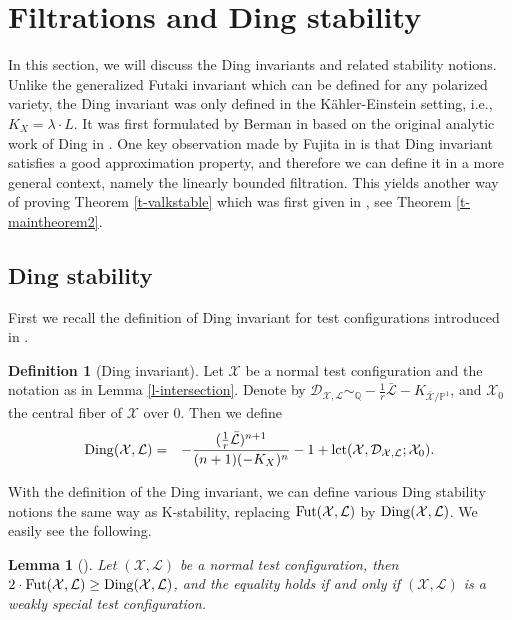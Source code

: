 \documentclass[12pt,reqno]{amsart}%
\newcommand{\cX}{{\mathcal{X}}}
\newcommand{\cL}{{\mathcal{L}}}
\newtheorem{lem}[thm]{Lemma}
\theoremstyle{definition}
\newtheorem{defn}[thm]{Definition}
\theoremstyle{remark}
\newcommand{\Fut}{{\rm Fut}}
\newcommand{\Ding}{{\rm Ding}}
\newcommand{\cD}{{\mathcal{D}}}
\newcommand{\lct}{{\rm lct}}
\newcommand{\bQ}{{\mathbb{Q}}}
\begin{document}
\section{Filtrations and Ding stability}\label{s-Ding}

In this section, we will discuss the Ding invariants and related stability notions. Unlike the generalized Futaki invariant which can be defined for any polarized variety, the Ding invariant was only defined in the K\"ahler-Einstein setting,  i.e.,  $K_X=\lambda \cdot L$. It was first formulated by Berman in \cite{Ber16} based on the original analytic work of Ding in \cite{Din88}. One key observation made by Fujita in \cite{Fuj18} is that Ding invariant satisfies a good approximation property, and therefore we can define it in a more general context, namely the linearly bounded filtration. This yields another way of proving Theorem \ref{t-valkstable} which was first given in \cites{Fuj19b, Li17}, see Theorem \ref{t-maintheorem2}. 
\subsection{Ding stability}
First we recall the definition of Ding invariant for test configurations introduced in \cite{Ber16}.
\begin{defn}[Ding invariant]\label{d-ding}
Let $\cX$ be a normal test configuration and the notation as in Lemma \ref{l-intersection}. Denote by $ \cD_{\cX,\cL}\sim_{\bQ} -\frac{1}{r} \bar{\cL}-K_{\bar{\cX}/\mathbb P^1}$, and $\cX_0$ the central fiber of $\cX$ over $0$.  Then we define 
\begin{eqnarray}\label{e-ding}
 \Ding(\cX,{\cL})&= &-\frac{ (\frac{1}{r}\bar{\cL})^{n+1}}{(n+1)(-K_X)^n}-1+\lct(\cX, \cD_{\cX,\cL};\cX_0).
\end{eqnarray}
\end{defn}
With the definition of the Ding invariant, we can define various Ding stability notions the same way as K-stability, replacing $\Fut(\cX,\cL)$ by $\Ding(\cX,\cL)$. 
We easily see the following.
\begin{lem}[{\cite{Ber16}}]\label{l-DvsK}Let $(\cX,\cL)$ be a normal test configuration, then $2\cdot \Fut(\cX,\cL)\ge \Ding(\cX,\cL)$, and the equality holds if and only if $(\cX,\cL)$ is a weakly special test configuration.  
\end{lem}
\end{document}
